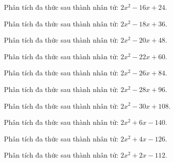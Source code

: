 \begin{bt}
	Phân tích đa thức sau thành nhân tử: $2 x^2 - 16 x + 24$.
\end{bt}
\begin{bt}
	Phân tích đa thức sau thành nhân tử: $2 x^2 - 18 x + 36$.
\end{bt}
\begin{bt}
	Phân tích đa thức sau thành nhân tử: $2 x^2 - 20 x + 48$.
\end{bt}
\begin{bt}
	Phân tích đa thức sau thành nhân tử: $2 x^2 - 22 x + 60$.
\end{bt}
\begin{bt}
	Phân tích đa thức sau thành nhân tử: $2 x^2 - 26 x + 84$.
\end{bt}
\begin{bt}
	Phân tích đa thức sau thành nhân tử: $2 x^2 - 28 x + 96$.
\end{bt}
\begin{bt}
	Phân tích đa thức sau thành nhân tử: $2 x^2 - 30 x + 108$.
\end{bt}
\begin{bt}
	Phân tích đa thức sau thành nhân tử: $2 x^2 + 6 x - 140$.
\end{bt}
\begin{bt}
	Phân tích đa thức sau thành nhân tử: $2 x^2 + 4 x - 126$.
\end{bt}
\begin{bt}
	Phân tích đa thức sau thành nhân tử: $2 x^2 + 2 x - 112$.
\end{bt}
